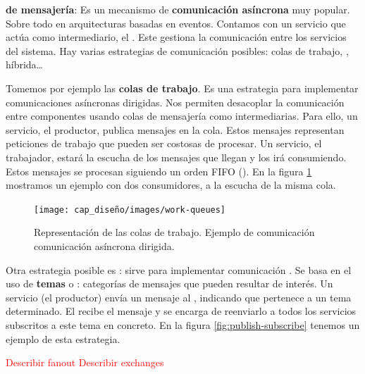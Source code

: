 \textbf{ de mensajería}: Es un mecanismo de \textbf{comunicación asíncrona} muy popular. Sobre todo en arquitecturas basadas en eventos. Contamos con un servicio que actúa como intermediario, el . Este gestiona la comunicación entre los servicios del sistema. \cite{newmanBuildingMicroservicesDesigning2021} Hay varias estrategias de comunicación posibles: colas de trabajo, , híbrida\dots

Tomemos por ejemplo las \textbf{colas de trabajo}. \cite{royChapterMessagePatterns2017} Es una estrategia para implementar comunicaciones asíncronas dirigidas. Nos permiten desacoplar la comunicación entre componentes usando colas de mensajería como intermediarias. Para ello, un servicio, el productor, publica mensajes en la cola. Estos mensajes representan peticiones de trabajo que pueden ser costosas de procesar. Un servicio, el trabajador, estará la escucha de los mensajes que llegan y los irá consumiendo. Estos mensajes se procesan siguiendo un orden FIFO (). En la figura \ref{fig:work-queues} mostramos un ejemplo con dos consumidores, a la escucha de la misma cola.

\begin{figure}[htb]
  \centering
  \texttt{[image: cap\_diseño/images/work-queues]}
  \caption[Representación de las colas de trabajo. Ejemplo de comunicación asíncrona dirigida.]{Representación de las colas de trabajo. Ejemplo de comunicación comunicación asíncrona dirigida. \footnotemark }
  \label{fig:work-queues}
\end{figure}


Otra estrategia posible es : sirve para implementar comunicación . Se basa en el uso de \textbf{temas} o \textbf{}: categorías de mensajes que pueden resultar de interés. Un servicio (el productor) envía un mensaje al , indicando que pertenece a un tema determinado. El  recibe el mensaje y se encarga de reenviarlo a todos los servicios subscritos a este tema en concreto. \cite{rabbitmqPublishSubscribeDocumentation} En la figura \ref{fig:publish-subscribe} tenemos un ejemplo de esta estrategia.

\textcolor{red}{Describir fanout}
\textcolor{red}{Describir exchanges}


